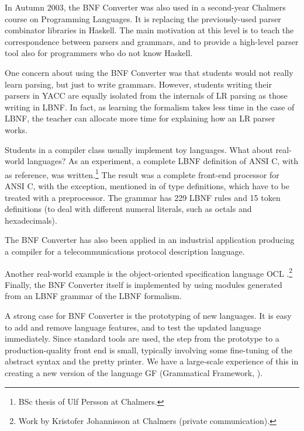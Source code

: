 In Autumn 2003, the BNF Converter was also used in a second-year Chalmers course
on Programming Languages. It is replacing the previously-used parser 
combinator libraries in Haskell.
The main motivation at this level is to teach the correspondence
between parsers and grammars, and to
provide a high-level parser tool also for programmers who do not know Haskell.

One concern about using the BNF Converter 
was that students would not really learn parsing, but just to write grammars. 
However, students writing their parsers in YACC 
are equally isolated from the internals of LR parsing as 
those writing in LBNF. In fact, as learning
the formalism takes less time in the case of LBNF, 
the teacher can allocate more
time for explaining how an LR parser works. 




\label{real}

Students in a compiler class usually implement toy languages.
What about real-world languages?
As an experiment, a complete LBNF definition of
ANSI C, with \cite{Kern88} as reference, was 
written.\footnote{BSc thesis of Ulf Persson at Chalmers.}
 The result was a complete front-end processor for ANSI C, 
with the exception, mentioned in \cite{Kern88} of type definitions,
which have to be treated with a preprocessor. The grammar has 229
LBNF rules and 15 token definitions (to deal with different numeral
literals, such as octals and hexadecimals).

The BNF Converter has also been applied in an industrial 
application producing a compiler for a telecommunications 
protocol description language. \cite{asn1} 

Another real-world example is the
object-oriented specification language OCL
\cite{WarmerKleppe99}.\footnote{
Work by Kristofer Johannisson at Chalmers (private communication).} 
Finally, the BNF Converter itself is implemented by 
using modules generated from an LBNF grammar of the LBNF formalism.


A strong case for BNF Converter is the prototyping of new
languages. It is easy to add and remove language
features, and to test the updated language immediately.
Since standard tools are used, the step from the 
prototype to a production-quality front end is small,
typically involving some fine-tuning of the abstract
syntax and the pretty printer. We have a large-scale
experience of this in creating a new version of the
language GF (Grammatical Framework, \cite{GF-paper}). 

